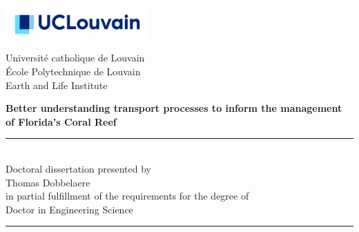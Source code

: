 \thispagestyle{empty}
\begin{minipage}[b]{0.3\textwidth}
\hspace*{-0.8cm}\includegraphics[width=5.5cm]{./figures/logo_ucl.jpg}\vspace{0.85cm}
\end{minipage}
\begin{minipage}[b]{0.69\textwidth}

\begin{center}
\hspace*{0.5cm}Université catholique de Louvain\\
\hspace*{0.5cm}\'Ecole Polytechnique de Louvain\\
\hspace*{0.5cm} Earth and Life Institute\\
\end{center}
\end{minipage}


\vspace*{1.2cm}
\hspace{-0.8cm}
\begin{minipage}{1.02\linewidth}
\centering
\LARGE\bfseries Better understanding transport processes to inform the management of Florida's Coral Reef %
\end{minipage}


\vspace*{0.5cm}
\hspace{-0.5cm}\begin{minipage}{\textwidth}
\centering
\rule{50pt}{.5pt}\\[1.2ex]
Doctoral dissertation presented by \\ [2.ex]
{\Large Thomas Dobbelaere\\ [2.ex]
}
in partial fulfillment of the requirements for the degree of\\ [2.ex]
\Large Doctor in Engineering Science

\rule{50pt}{.5pt}\\
\end{minipage}

